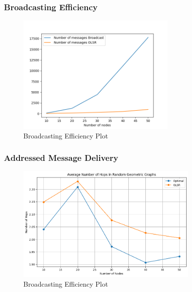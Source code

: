 \documentclass[11pt]{beamer}              %
\begin{document}
\begin{frame}
\frametitle{Broadcasting Efficiency}

    \begin{figure}
        \centering
        \includegraphics[width=0.7\textwidth]{figures/comparison.png}
        \caption{Broadcasting Efficiency Plot}
    \end{figure}    

\end{frame}

\begin{frame}
\frametitle{Addressed Message Delivery}

    \begin{figure}
        \centering
        \includegraphics[width=0.8\textwidth]{figures/hops.png}
        \caption{Broadcasting Efficiency Plot}
    \end{figure}    

\end{frame}
\end{document}
